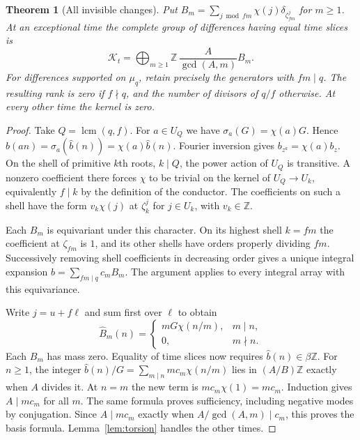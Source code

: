 \documentclass[11pt,letterpaper]{article}
\newtheorem{theorem}{Theorem}[section]
\newcommand{\Z}{\mathbb Z}
\begin{document}
\begin{theorem}[All invisible changes]\label{thm:lattice}
Put $B_m=\sum_{j\bmod fm}\chi(j)\delta_{\zeta_{fm}^j}$ for $m\ge1$. At an exceptional time the complete group of differences having equal time slices is
\begin{equation}\label{eq:lattice}
 \mathcal K_t=\bigoplus_{m\ge1}\Z\,\frac{A}{\gcd(A,m)} B_m .
\end{equation}
For differences supported on $\mu_q$, retain precisely the generators with $fm\mid q$. The resulting rank is zero if $f\nmid q$, and the number of divisors of $q/f$ otherwise. At every other time the kernel is zero.
\end{theorem}
\begin{proof}
Take $Q=\operatorname{lcm}(q,f)$. For $a\in U_Q$ we have $\sigma_a(G)=\chi(a)G$. Hence $\widehat b(an)=\sigma_a(\widehat b(n))=\chi(a)\widehat b(n)$. Fourier inversion gives $b_{z^a}=\chi(a)b_z$. On the shell of primitive $k$th roots, $k\mid Q$, the power action of $U_Q$ is transitive. A nonzero coefficient there forces $\chi$ to be trivial on the kernel of $U_Q\to U_k$, equivalently $f\mid k$ by the definition of the conductor. The coefficients on such a shell have the form $v_k\chi(j)$ at $\zeta_k^j$ for $j\in U_k$, with $v_k\in\Z$.

Each $B_m$ is equivariant under this character. On its highest shell $k=fm$ the coefficient at $\zeta_{fm}$ is $1$, and its other shells have orders properly dividing $fm$. Successively removing shell coefficients in decreasing order gives a unique integral expansion $b=\sum_{fm\mid q}c_mB_m$. The argument applies to every integral array with this equivariance.

Write $j=u+f\ell$ and sum first over $\ell$ to obtain
\begin{equation}\label{eq:DFT}
 \widehat B_m(n)=
 \begin{cases}mG\chi(n/m),&m\mid n,\\0,&m\nmid n.\end{cases}
\end{equation}
Each $B_m$ has mass zero. Equality of time slices now requires $\widehat b(n)\in\beta\Z$. For $n\ge1$, the integer $\widehat b(n)/G=\sum_{m\mid n}mc_m\chi(n/m)$ lies in $(A/B)\Z$ exactly when $A$ divides it. At $n=m$ the new term is $mc_m\chi(1)=mc_m$. Induction gives $A\mid mc_m$ for all $m$. The same formula proves sufficiency, including negative modes by conjugation. Since $A\mid mc_m$ exactly when $A/\gcd(A,m)\mid c_m$, this proves the basis formula. Lemma~\ref{lem:torsion} handles the other times.
\end{proof}
\end{document}
